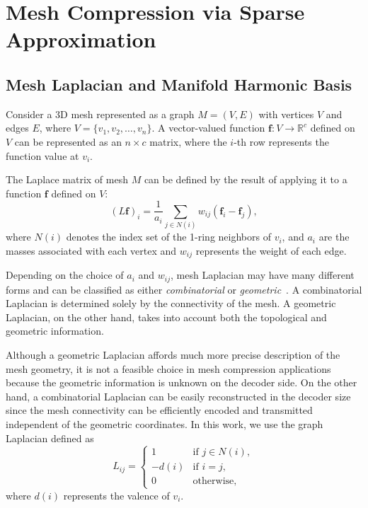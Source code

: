 \section{Mesh Compression via Sparse Approximation}

\subsection{Mesh Laplacian and Manifold Harmonic Basis}
\label{sec:mhb}

Consider a 3D mesh represented as a graph $M=(V,E)$ with vertices $V$
and edges $E$, where $V=\{v_1,v_2,\ldots,v_n\}$. A vector-valued
function $\mathbf{f}:V\to\mathbb{R}^c$ defined on $V$ can be
represented as an $n\times c$ matrix, where the $i$-th row represents
the function value at $v_i$.

The Laplace matrix of mesh $M$ can be defined by the result of applying it to a function
$\mathbf{f}$ defined on $V$:
\begin{equation}
  (L\mathbf{f})_i=\frac{1}{a_i}\sum_{j\in N(i)} w_{ij}(\mathbf{f}_i-\mathbf{f}_j),
\end{equation}
where $N(i)$ denotes the index set of the 1-ring neighbors of $v_i$,
and $a_i$ are the masses associated with each vertex and $w_{ij}$
represents the weight of each edge.

Depending on the choice of $a_i$ and $w_{ij}$, mesh Laplacian may have
many different forms and can be classified as either
\emph{combinatorial} or \emph{geometric}~\cite{Zhang:2010:CGF}. A
combinatorial Laplacian is determined solely by the connectivity of
the mesh. A geometric Laplacian, on the other hand, takes into account
both the topological and geometric information.

Although a geometric Laplacian affords much more precise description
of the mesh geometry, it is not a feasible choice in mesh compression
applications because the geometric information is unknown on the
decoder side. On the other hand, a combinatorial Laplacian can be
easily reconstructed in the decoder size since the mesh connectivity
can be efficiently encoded and transmitted independent of the
geometric coordinates. In this work, we use the graph Laplacian
defined as
\begin{equation}
L_{ij} =
\begin{cases}
1 & \text{if } j \in N(i),\\
-d(i) & \text{if } i=j,\\
0 & \text{otherwise,}
\end{cases}
\end{equation}
where $d(i)$ represents the valence of $v_i$.


